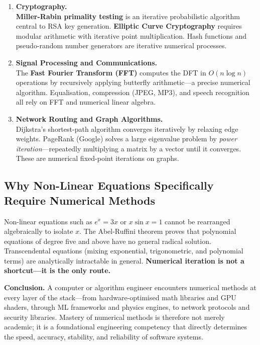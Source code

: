 \documentclass[12pt]{article}
\begin{document}
\begin{enumerate}[noitemsep, topsep=6pt, leftmargin=*, label=\textbf{\arabic*.}]
  \item \textbf{Cryptography.}\\
        \textbf{Miller-Rabin primality testing} is an iterative probabilistic algorithm central to RSA key generation. \textbf{Elliptic Curve Cryptography} requires modular arithmetic with iterative point multiplication. Hash functions and pseudo-random number generators are iterative numerical processes.

  \item \textbf{Signal Processing and Communications.}\\
        The \textbf{Fast Fourier Transform (FFT)} computes the DFT in $O(n\log n)$ operations by recursively applying butterfly arithmetic---a precise numerical algorithm. Equalisation, compression (JPEG, MP3), and speech recognition all rely on FFT and numerical linear algebra.

  \item \textbf{Network Routing and Graph Algorithms.}\\
        Dijkstra's shortest-path algorithm converges iteratively by relaxing edge weights. PageRank (Google) solves a large eigenvalue problem by \emph{power iteration}---repeatedly multiplying a matrix by a vector until it converges. These are numerical fixed-point iterations on graphs.

\end{enumerate}

\vspace{8pt}

\subsection*{Why Non-Linear Equations Specifically Require Numerical Methods}

\begin{conceptbox}
Non-linear equations such as $e^x = 3x$ or $x\sin x = 1$ cannot be rearranged algebraically to isolate $x$. The Abel-Ruffini theorem proves that polynomial equations of degree five and above have no general radical solution. Transcendental equations (mixing exponential, trigonometric, and polynomial terms) are analytically intractable in general. \textbf{Numerical iteration is not a shortcut---it is the only route.}
\end{conceptbox}

\vspace{8pt}

\begin{answerbox}
\textbf{Conclusion.} A computer or algorithm engineer encounters numerical methods at every layer of the stack---from hardware-optimised math libraries and GPU shaders, through ML frameworks and physics engines, to network protocols and security libraries. Mastery of numerical methods is therefore not merely academic; it is a foundational engineering competency that directly determines the speed, accuracy, stability, and reliability of software systems.
\end{answerbox}
\end{document}
